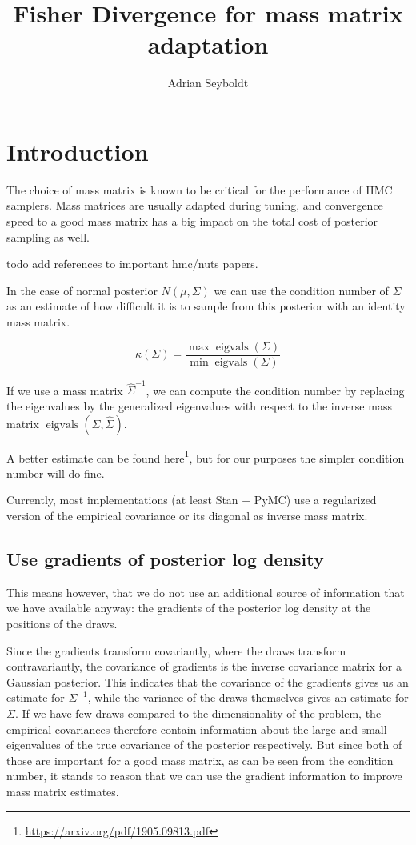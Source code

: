 \documentclass{scrartcl}
\title{Fisher Divergence for mass matrix adaptation}
\author{Adrian Seyboldt}
\DeclareMathOperator{\eigvals}{eigvals}
\begin{document}
\maketitle

\section{Introduction}

The choice of mass matrix is known to be critical for the performance of HMC
samplers. Mass matrices are usually adapted during tuning, and convergence
speed to a good mass matrix has a big impact on the total cost of posterior
sampling as well.

todo add references to important hmc/nuts papers.

In the case of normal posterior $N(\mu, \Sigma)$ we can use the condition
number of $\Sigma$ as an estimate of how difficult it is to sample from
this posterior with an identity mass matrix.

\[
\kappa(\Sigma) = \frac{\max{\eigvals(\Sigma)}}{\min{\eigvals(\Sigma)}}
\]

If we use a mass matrix $\hat{\Sigma}^{-1}$, we can compute the
condition number by replacing the eigenvalues by the generalized eigenvalues
with respect to the inverse mass matrix $\eigvals(\Sigma, \hat\Sigma)$.

A better estimate can be found
here\footnote{\url{https://arxiv.org/pdf/1905.09813.pdf}}, but for our purposes
the simpler condition number will do fine.

Currently, most implementations (at least Stan + PyMC) use a regularized
version of the empirical covariance or its diagonal as inverse mass matrix.

\subsection{Use gradients of posterior log density}

This means however, that we do not use an additional source of information that
we have available anyway: the gradients of the posterior log density at the
positions of the draws.

Since the gradients transform covariantly, where the draws transform
contravariantly, the covariance of gradients is the inverse covariance matrix
for a Gaussian posterior. This indicates that the covariance of the gradients
gives us an estimate for $\Sigma^{-1}$, while the variance of the draws
themselves gives an estimate for $\Sigma$. If we have few draws compared to the
dimensionality of the problem, the empirical covariances therefore contain
information about the large and small eigenvalues of the true covariance of the
posterior respectively. But since both of those are important for a good mass
matrix, as can be seen from the condition number, it stands to reason that we
can use the gradient information to improve mass matrix estimates.
\end{document}
